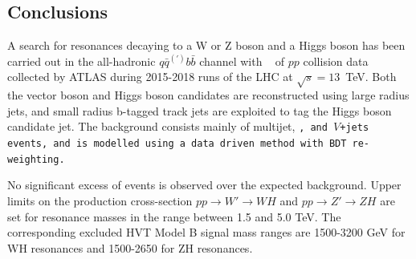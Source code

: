 \subsection{Conclusions}
A search for resonances decaying to a W or Z boson and a Higgs boson has been carried out in the all-hadronic $q\bar{q}^{(\prime)}b\bar{b}$ channel with \lumi~ of $pp$ collision data collected by ATLAS during 2015-2018 runs of the LHC at $\sqrt{s} = 13$~TeV.
Both the vector boson and Higgs boson candidates are reconstructed using large radius jets, and small radius b-tagged track jets are exploited to tag the Higgs boson candidate jet.
The background consists mainly of multijet, \tt, and $V$+jets events, and is modelled using a data driven method with BDT re-weighting.

No significant excess of events is observed over the expected background.
Upper limits on the production cross-section $pp \rightarrow W' \rightarrow WH$ and $pp \rightarrow Z' \rightarrow ZH$ are set for resonance masses in the range between 1.5 and 5.0 TeV.
The corresponding excluded HVT Model B signal mass ranges are 1500-3200 GeV for WH resonances and 1500-2650 for ZH resonances.
